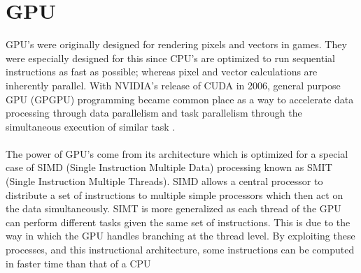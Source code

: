 \documentclass{article}
\begin{document}
\section{GPU}
GPU's were originally designed for rendering pixels and vectors in games. They were especially designed for this since CPU's are optimized to run sequential instructions as fast as possible; whereas pixel and vector calculations are inherently parallel. With NVIDIA's release of CUDA in 2006, general purpose GPU (GPGPU) programming became common place as a way to accelerate data processing through data parallelism and task parallelism through the simultaneous execution of similar task \cite{nvidia_cuda}.
\\
\\
The power of GPU's come from its architecture which is optimized for a special case of SIMD (Single Instruction Multiple Data) processing known as SMIT (Single Instruction Multiple Threads). SIMD allows a central processor to distribute a set of instructions to multiple simple processors which then act on the data simultaneously. SIMT is more generalized as each thread of the GPU can perform different tasks given the same set of instructions. This is due to the way in which the GPU handles branching at the thread level. By exploiting these processes, and this instructional architecture, some instructions can be computed in faster time than that of a CPU \cite{vuduc2013brief}



\end{document}
